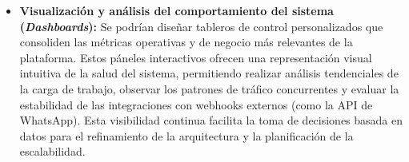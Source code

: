 \begin{itemize}
    \item \textbf{Visualización y análisis del comportamiento del sistema (\textit{Dashboards}):} Se podrían diseñar tableros de control personalizados que consoliden las métricas operativas y de negocio más relevantes de la plataforma. Estos páneles interactivos ofrecen una representación visual intuitiva de la salud del sistema, permitiendo realizar análisis tendenciales de la carga de trabajo, observar los patrones de tráfico concurrentes y evaluar la estabilidad de las integraciones con webhooks externos (como la API de WhatsApp). Esta visibilidad continua facilita la toma de decisiones basada en datos para el refinamiento de la arquitectura y la planificación de la escalabilidad.
\end{itemize}
